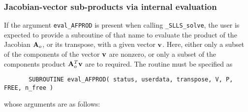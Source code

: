 \documentclass{galahad}
\newcommand{\packagename}{SLLS}
\newcommand{\fullpackagename}{\libraryname\_\packagename}
\newcommand{\solver}{{\tt \fullpackagename\_solve}}
\begin{document}

\subsubsection{Jacobian-vector sub-products via internal evaluation\label{jvsp}}

If the argument {\tt eval\_AFPROD} is present when calling \solver, the
user is expected to provide a subroutine of that name to evaluate the
product of the Jacobian ${\mathbf{A}}_o$, or its transpose, with a given vector ${\mathbf{v}}$.
Here, either only a subset of the components of the vector ${\mathbf{v}}$ are nonzero,
or only a subset of the components product ${\mathbf{A}}_o^T {\mathbf{v}}$ are to required.
The routine must be specified as

\def\baselinestretch{0.8}
{\tt \begin{verbatim}
       SUBROUTINE eval_AFPROD( status, userdata, transpose, V, P, FREE, n_free )
\end{verbatim} }
\def\baselinestretch{1.0}
\noindent whose arguments are as follows:
\end{document}
